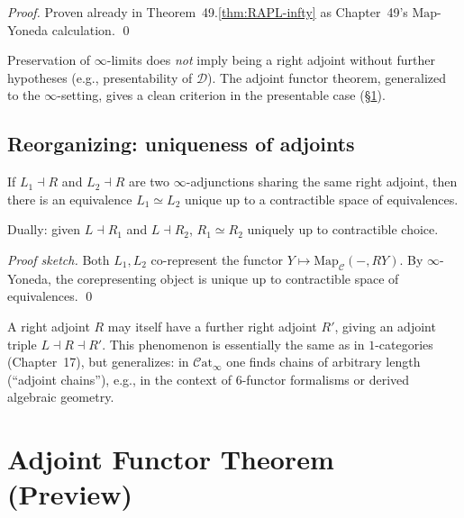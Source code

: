 \begin{proof}
Proven already in Theorem~49.\ref{thm:RAPL-infty} as Chapter~49's
$\mathrm{Map}$-Yoneda calculation. \qed
\end{proof}

\begin{remark}
Preservation of $\infty$-limits does \emph{not} imply being a right adjoint
without further hypotheses (e.g., presentability of $\mathcal{D}$). The
adjoint functor theorem, generalized to the $\infty$-setting, gives a
clean criterion in the presentable case (\S\ref{sec:aft-presentable}).
\end{remark}

\subsection{Reorganizing: uniqueness of adjoints}

\begin{theorem}
\label{thm:uniqueness-adjoints}
If $L_1 \dashv R$ and $L_2 \dashv R$ are two $\infty$-adjunctions sharing
the same right adjoint, then there is an equivalence $L_1 \simeq L_2$
unique up to a contractible space of equivalences.

Dually: given $L \dashv R_1$ and $L \dashv R_2$, $R_1 \simeq R_2$
uniquely up to contractible choice.
\end{theorem}

\begin{proof}[Proof sketch]
Both $L_1, L_2$ co-represent the functor $Y \mapsto \mathrm{Map}_\mathcal{C}(-, RY)$.
By $\infty$-Yoneda, the corepresenting object is unique up to contractible
space of equivalences. \qed
\end{proof}

\begin{remark}
A right adjoint $R$ may itself have a further right adjoint $R'$, giving
an adjoint triple $L \dashv R \dashv R'$. This phenomenon is essentially
the same as in $1$-categories (Chapter~17), but generalizes: in
$\mathcal{C}\mathrm{at}_\infty$ one finds chains of arbitrary length
(``adjoint chains''), e.g., in the context of $6$-functor formalisms or
derived algebraic geometry.
\end{remark}


\section{Adjoint Functor Theorem (Preview)}
\label{sec:aft-presentable}

